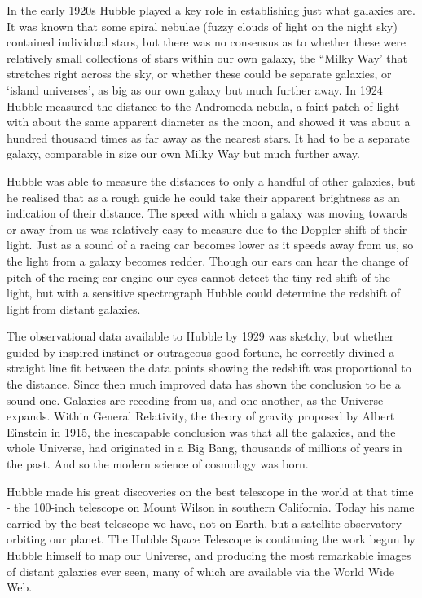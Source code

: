 In the early 1920s Hubble played a key role in establishing just what galaxies are. It was known that some spiral nebulae (fuzzy clouds of light on the night sky) contained individual stars, but there was no consensus as to whether these were relatively small collections of stars within our own galaxy, the “Milky Way’ that stretches right across the sky, or whether these could be separate galaxies, or ‘island universes’, as big as our own galaxy but much further away. In 1924 Hubble measured the distance to the Andromeda nebula, a faint patch of light with about the same apparent diameter as the moon, and showed it was about a hundred thousand times as far away as the nearest stars. It had to be a separate galaxy, comparable in size our own Milky Way but much further away.

Hubble was able to measure the distances to only a handful of other galaxies, but he realised that as a rough guide he could take their apparent brightness as an indication of their distance. The speed with which a galaxy was moving towards or away from us was relatively easy to measure due to the Doppler shift of their light. Just as a sound of a racing car becomes lower as it speeds away from us, so the light from a galaxy becomes redder. Though our ears can hear the change of pitch of the racing car engine our eyes cannot detect the tiny red-shift of the light, but with a sensitive spectrograph Hubble could determine the redshift of light from distant galaxies.

The observational data available to Hubble by 1929 was sketchy, but whether guided by inspired instinct or outrageous good fortune, he correctly divined a straight line fit between the data points showing the redshift was proportional to the distance. Since then much improved data has shown the conclusion to be a sound one. Galaxies are receding from us, and one another, as the Universe expands. Within General Relativity, the theory of gravity proposed by Albert Einstein in 1915, the inescapable conclusion was that all the galaxies, and the whole Universe, had originated in a Big Bang, thousands of millions of years in the past. And so the modern science of cosmology was born.

Hubble made his great discoveries on the best telescope in the world at that time - the 100-inch telescope on Mount Wilson in southern California. Today his name carried by the best telescope we have, not on Earth, but a satellite observatory orbiting our planet. The Hubble Space Telescope is continuing the work begun by Hubble himself to map our Universe, and producing the most remarkable images of distant galaxies ever seen, many of which are available via the World Wide Web.

